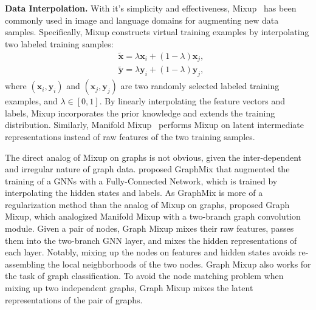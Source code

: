 \documentclass[11pt]{article}
\renewcommand\paragraph[1]{\vspace{0.05in} \noindent \textbf{#1.}}
\begin{document}
\paragraph{Data Interpolation}
With it's simplicity and effectiveness, Mixup~\cite{zhang2017mixup} has been commonly used in image and language domains for augmenting new data samples. Specifically, Mixup constructs virtual training examples by interpolating two labeled training samples:
\begin{equation}
    \begin{array}{cc}
         & \tilde{\boldsymbol{x}} = \lambda\boldsymbol{x}_i + (1-\lambda)\boldsymbol{x}_j, \\
         & \tilde{\boldsymbol{y}} = \lambda\boldsymbol{y}_i + (1-\lambda)\boldsymbol{y}_j,
    \end{array}
\end{equation}
where $(\boldsymbol{x}_i, \boldsymbol{y}_i)$ and $(\boldsymbol{x}_j, \boldsymbol{y}_j)$ are two randomly selected labeled training examples, and $\lambda \in [0,1]$. By linearly interpolating the feature vectors and labels, Mixup incorporates the prior knowledge and extends the training distribution. Similarly, Manifold Mixup~\cite{verma2019manifold} performs Mixup on latent intermediate representations instead of raw features of the two training samples.  

The direct analog of Mixup on graphs is not obvious, given the inter-dependent and irregular nature of graph data.
\citet{verma2019graphmix} proposed GraphMix that augmented the training of a GNNs with a Fully-Connected Network, which is trained by interpolating the hidden states and labels. 
As GraphMix is more of a regularization method than the analog of Mixup on graphs, \citet{wang2021mixup} proposed Graph Mixup, which analogized Manifold Mixup with a two-branch graph convolution module. Given a pair of nodes, Graph Mixup mixes their raw features, passes them into the two-branch GNN layer, and mixes the hidden representations of each layer. Notably, mixing up the nodes on features and hidden states avoids re-assembling the local neighborhoods of the two nodes. Graph Mixup also works for the task of graph classification.
To avoid the node matching problem when mixing up two independent graphs, Graph Mixup mixes the latent representations of the pair of graphs. 
\end{document}
